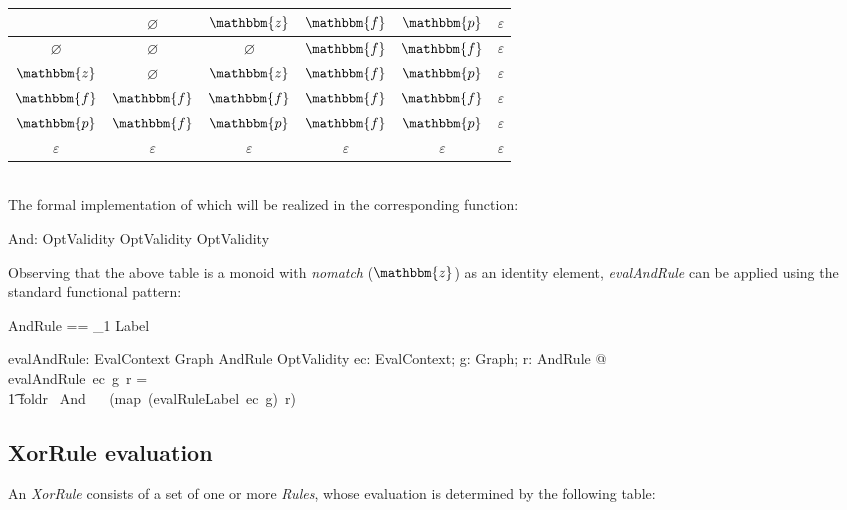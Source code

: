 \documentclass[fuzz]{llncs}
\def\pass{{\mathbbm{p}}}
\def\fail{{\mathbbm{f}}}
\def\dunno{\varnothing}
\def\error{\varepsilon}
\def\nomatch{\mathbbm{z}}
\def\zc{\textit}
\def\zcb{\textit{\textbf}}
\begin{document}
\begin{tabular}{c || c | c | c | c | c |}
   \hline 
   \zcb{And} & $\dunno$ & $\nomatch$ & $\fail$ & $\pass$ & $\error$ \\
   \hline \hline
   $\dunno$ & $\dunno$ & $\dunno$ & $\fail$ & $\fail$ & $\error$ \\ \hline
   $\nomatch$ & $\dunno$ & $\nomatch$ & $\fail$ & $\pass$ & $\error$ \\ \hline
   $\fail$ & $\fail$ & $\fail$ & $\fail$ & $\fail$ & $\error$ \\ \hline
   $\pass$ & $\fail$ & $\pass$ & $\fail$ & $\pass$ & $\error$ \\ \hline
   $\error$ & $\error$ & $\error$ & $\error$ & $\error$ & $\error$ \\ \hline 
\end{tabular} \\

The formal implementation of which will be realized in the corresponding function:
\begin{gendef}
   And: OptValidity \fun OptValidity \fun OptValidity
\end{gendef}

Observing that the above table is a monoid with \zc{nomatch} ($\nomatch$) as an identity
element, \zc{evalAndRule} can be applied using the standard functional pattern:
\begin{zed}
AndRule == \seq_1 Label
\end{zed}
\begin{gendef}
   evalAndRule: EvalContext \fun Graph \fun AndRule \fun OptValidity
\where
   \forall ec: EvalContext; g: Graph; r: AndRule  @ \\
	evalAndRule~ec~g~r = \\
\t1	foldr~ And~ \nomatch ~ (map~(evalRuleLabel~ec~g)~r)
\end{gendef}

\subsection{XorRule evaluation}
An \zc{XorRule} consists of a set of one or more \zc{Rules}, whose evaluation is determined
by the following table: \\
\end{document}

